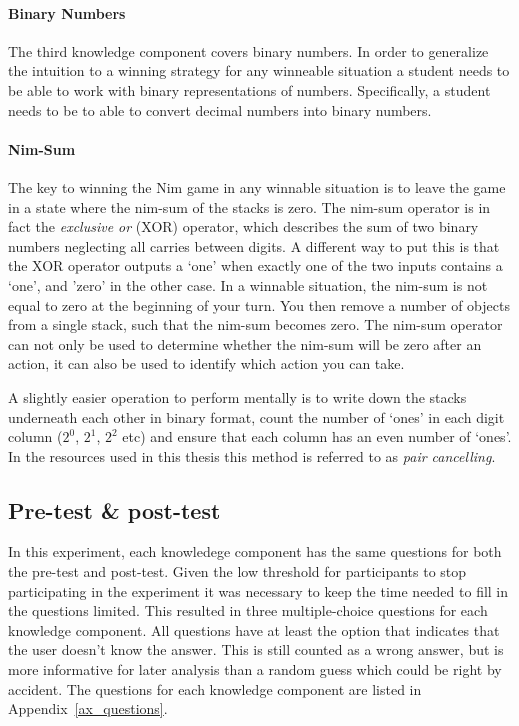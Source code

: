 \paragraph{Binary Numbers} The third knowledge component covers binary numbers.
In order to generalize the intuition to a winning strategy
for any winneable situation a student needs to be able to work with binary
representations of numbers. Specifically, a student needs to be to able to
convert decimal numbers into binary numbers.
\paragraph{Nim-Sum}
The key to winning the Nim game in any winnable situation is to leave the game
in a state where the nim-sum of the stacks is zero. The nim-sum operator is in
fact the \emph{exclusive or} (XOR) operator, which describes the sum of two
binary numbers neglecting all carries between digits. A different way to put
this is that the XOR operator outputs a `one' when exactly one of the two
inputs contains a `one', and 'zero' in the other case. In a winnable situation,
the nim-sum is not equal to zero at the beginning of your turn. You then remove a
number of objects from a single stack, such that the nim-sum becomes zero.
The nim-sum operator can not only be used to determine whether the nim-sum will
be zero after an action, it can also be used to identify which action you can take.

A slightly easier operation to perform mentally is to write down the stacks
underneath each other in binary format, count the number of `ones' in each
digit column ($2^0$, $2^1$, $2^2$ etc) and ensure that each column has an even
number of `ones'. In the resources used in this thesis this method is referred
to as \emph{pair cancelling}.
\subsection{Pre-test \& post-test}
\label{sec:setup_tests}
In this experiment, each knowledege component has the same questions for both
the pre-test and post-test. Given the low threshold for participants to stop
participating in the experiment it was necessary to keep the time needed to
fill in the questions limited. This resulted in three multiple-choice
questions for each knowledge component. All questions have at least the option that
indicates that the user doesn't know the answer. This is still counted as a
wrong answer, but is more informative for later analysis than a random guess
which could be right by accident. The questions for each knowledge component
are listed in Appendix~\ref{ax_questions}.


